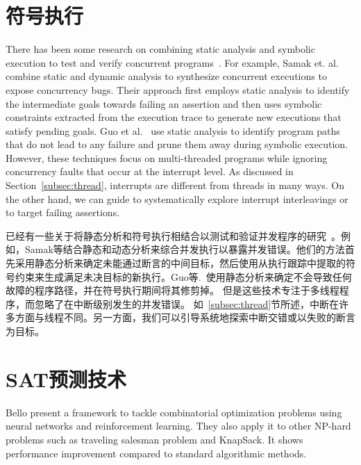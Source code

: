 \section{符号执行}
There has been some research on 
combining static analysis and symbolic execution
to test and verify concurrent programs~\cite{Farzan13,sen2006cute,
samak2015synthesizing, samak2016directed, Guo15, wang2017automatic}.
For example,  Samak et. al. \cite{samak2016directed}  
combine  static and dynamic analysis to synthesize 
concurrent executions to expose concurrency bugs.
Their approach first employs static analysis to identify the intermediate goals 
towards failing an assertion and then uses 
symbolic constraints extracted from the 
execution trace to generate new executions that satisfy pending goals.
Guo et al.~\cite{Guo15} use static analysis to identify program paths that do
not lead to any failure and prune them away during symbolic execution.
However, these techniques focus on multi-threaded
programs while ignoring concurrency faults
that occur at the interrupt level. 
As discussed in Section~\ref{subsec:thread}, interrupts are different from
threads in many ways.  On the other hand, we can 
guide \Name{} to systematically explore interrupt
interleavings or to target failing assertions. 

已经有一些关于将静态分析和符号执行相结合以测试和验证并发程序的研究~\cite{Farzan13,sen2006cute, samak2015synthesizing, samak2016directed, Guo15, wang2017automatic}。例如，Samak等\cite{samak2016directed}结合静态和动态分析来综合并发执行以暴露并发错误。他们的方法首先采用静态分析来确定未能通过断言的中间目标，然后使用从执行跟踪中提取的符号约束来生成满足未决目标的新执行。Guo等.~\cite{Guo15}使用静态分析来确定不会导致任何故障的程序路径，并在符号执行期间将其修剪掉。 但是这些技术专注于多线程程序，而忽略了在中断级别发生的并发错误。 如~\ref{subsec:thread}节所述，中断在许多方面与线程不同。另一方面，我们可以引导\Name{}系统地探索中断交错或以失败的断言为目标。

\section{SAT预测技术}\label{sec:related:dyn}

Bello \etal \cite{Bello2016} present a framework to tackle combinatorial
optimization problems using neural networks and reinforcement
learning. They also apply it to other NP-hard problems such as
traveling salesman problem and KnapSack.  It shows performance
improvement compared to standard algorithmic methods.

